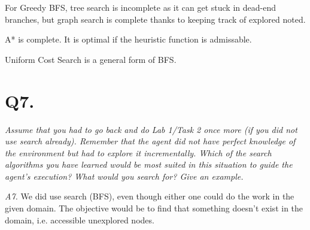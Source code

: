     For Greedy BFS, tree search is incomplete as it can get stuck in dead-end branches, but graph search is
    complete thanks to keeping track of explored noted.

    A* is complete. It is optimal if the heuristic function is admissable.

    Uniform Cost Search is a general form of BFS.

\section{Q7.}
\em Assume that you had to go back and do Lab 1/Task 2 once more (if you did not use search already).
    Remember that the agent did not have perfect knowledge of the environment but had to explore it
    incrementally. Which of the search algorithms you have learned would be most suited in this situation
    to guide the agent's execution? What would you search for? Give an example.\em

    \emph{A7.}
    We did use search (BFS), even though either one could do the work in the given domain. The objective
    would be to find that something doesn't exist in the domain, i.e. accessible unexplored nodes.
